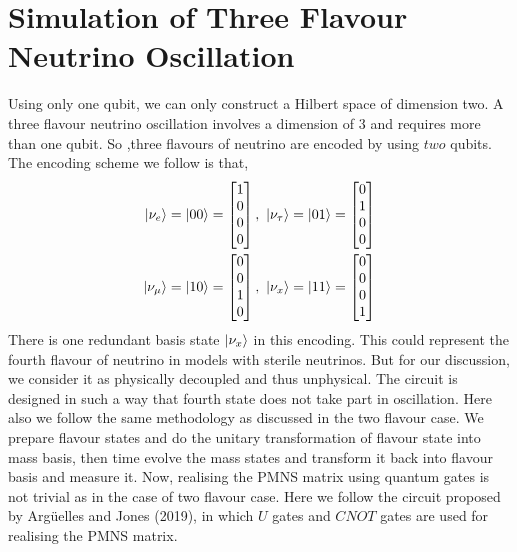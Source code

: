 \documentclass[12pt,a4paper]{report}
\begin{document}
\section{Simulation of Three Flavour Neutrino Oscillation}\label{3FO}
Using only one qubit, we can only construct a Hilbert space of dimension two. A three flavour neutrino oscillation involves a dimension of $3$ and requires more than one qubit. So ,three flavours of neutrino are encoded by using $two$ qubits. The encoding scheme we follow is that,
\begin{equation}
\label{eq:17}
\begin{split}
\ket{\nu_{e}}& = \ket{00} = \begin{bmatrix} 1\\0\\0\\0 \end{bmatrix}, \ \ket{\nu_{\tau}} = \ket{01} = \begin{bmatrix} 0\\1\\0\\0 \end{bmatrix} \\
\ket{\nu_{\mu}}&=\ket{10}=\begin{bmatrix} 0\\0\\1\\0 \end{bmatrix}, \ \ket{\nu_{x}} = \ket{11} = \begin{bmatrix} 0\\0\\0\\1 \end{bmatrix} 
\end{split}
\end{equation}
There is one redundant basis state  $\ket{\nu_{x}}$ in this encoding. This could represent the fourth flavour of neutrino in models with sterile neutrinos. But for our discussion, we consider it as physically decoupled and thus unphysical. The circuit is designed in such a way that fourth state does not take part in oscillation. Here also we follow the same methodology as discussed in the two flavour case. We prepare flavour states and do the unitary transformation of flavour state into mass basis, then time evolve the mass states and transform it back into flavour basis and measure it. Now, realising the PMNS matrix using quantum gates is not trivial as in the case of two flavour case. Here we follow the circuit proposed by Arg\"uelles and Jones (2019)\cite{jones}, in which $U$ gates and $CNOT$ gates are used for realising the PMNS matrix. 
\end{document}
